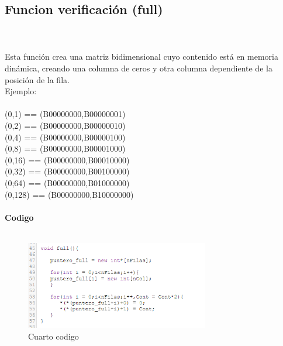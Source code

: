 \documentclass{article}
\begin{document}
\subsection{\large Funcion verificación (full)}\\\\
Esta función crea una matriz bidimensional cuyo contenido está en memoria dinámica, creando una columna de ceros y otra columna dependiente de la posición de la fila.\\
Ejemplo:\\\\
(0,1) == (B00000000,B00000001)\\
(0,2) == (B00000000,B00000010) \\
(0,4) == (B00000000,B00000100) \\ 
(0,8) == (B00000000,B00001000) \\
(0,16) == (B00000000,B00010000) \\
(0,32) == (B00000000,B00100000) \\
(0;64) == (B00000000,B01000000) \\
(0,128) == (B00000000,B10000000) \\
\\
\textbf{\large Codigo}\\\\
\begin{figure}[h]
    \includegraphics[width=8cm]{Imagen7.png}
    \centering
    \caption{Cuarto codigo}
    \label{fig:Imagen7}
\end{figure}\\\\
\end{document}
